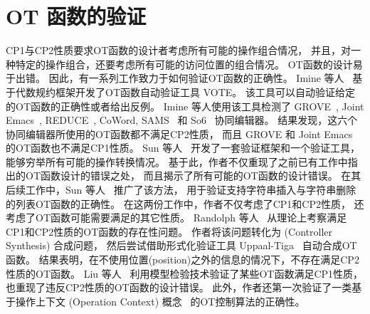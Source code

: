 \section{OT 函数的验证}

CP1与CP2性质要求OT函数的设计者考虑所有可能的操作组合情况，
并且，对一种特定的操作组合，还要考虑所有可能的访问位置的组合情况。
OT函数的设计易于出错。
因此，有一系列工作致力于如何验证OT函数的正确性。
Imine 等人~\cite{Imine:TCS06} 基于代数规约框架开发了OT函数自动验证工具 VOTE。
该工具可以自动验证给定的OT函数的正确性或者给出反例。
Imine 等人使用该工具检测了 GROVE~\cite{Ellis:SIGMOD89}, 
Joint Emacs~\cite{Ressel:CSCW96}, REDUCE~\cite{Sun:TOCHI98}, 
CoWord, SAMS~\cite{Molli:CSCW02} 和 So6~\cite{Sun:CSCW04} 协同编辑器。
结果发现，这六个协同编辑器所使用的OT函数都不满足CP2性质，
而且 GROVE 和 Joint Emacs 的OT函数也不满足CP1性质。
Sun 等人~\cite{Sun:CSCW14} 开发了一套验证框架和一个验证工具，
能够穷举所有可能的操作转换情况。
基于此，作者不仅重现了之前已有工作中指出的OT函数设计的错误之处，
而且揭示了所有可能的OT函数的设计错误。
在其后续工作中，Sun 等人~\cite{Sun:CSCW17} 推广了该方法，
用于验证支持字符串插入与字符串删除的列表OT函数的正确性。
在这两份工作中，作者不仅考虑了CP1和CP2性质，
还考虑了OT函数可能需要满足的其它性质。
Randolph 等人~\cite{Randolph:arXiv13} 从理论上考察满足CP1和CP2性质的OT函数的存在性问题。
作者将该问题转化为 (Controller Synthesis) 合成问题，
然后尝试借助形式化验证工具 Uppaal-Tiga~\cite{Cassez:CONCUR05} 自动合成OT函数。
结果表明，在不使用位置(position)之外的信息的情况下，不存在满足CP2性质的OT函数。
Liu 等人~\cite{Liu:FM04} 利用模型检验技术验证了某些OT函数满足CP1性质，
也重现了违反CP2性质的OT函数的设计错误。
此外，作者还第一次验证了一类基于操作上下文 (Operation Context) 概念~\cite{Sun:CSCW06} 的OT控制算法的正确性。